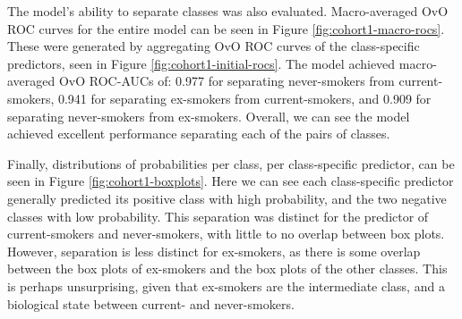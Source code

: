 \documentclass{article} %
\begin{document}
The model's ability to separate classes was also evaluated. Macro-averaged OvO ROC curves for the entire model can be seen in Figure \ref{fig:cohort1-macro-rocs}. These were generated by aggregating OvO ROC curves of the class-specific predictors, seen in Figure \ref{fig:cohort1-initial-rocs}. The model achieved macro-averaged OvO ROC-AUCs of: 0.977 for separating never-smokers from current-smokers, 0.941 for separating ex-smokers from current-smokers, and 0.909 for separating never-smokers from ex-smokers. Overall, we can see the model achieved excellent performance separating each of the pairs of classes.

Finally, distributions of probabilities per class, per class-specific predictor, can be seen in Figure \ref{fig:cohort1-boxplots}. Here we can see each class-specific predictor generally predicted its positive class with high probability, and the two negative classes with low probability. This separation was distinct for the predictor of current-smokers and never-smokers, with little to no overlap between box plots. However, separation is less distinct for ex-smokers, as there is some overlap between the box plots of ex-smokers and the box plots of the other classes. This is perhaps unsurprising, given that ex-smokers are the intermediate class, and a biological state between current- and never-smokers.
\end{document}
